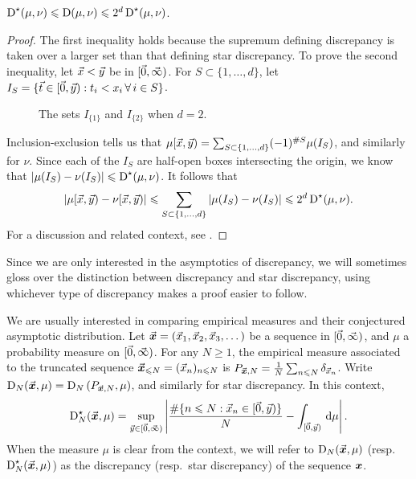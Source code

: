 \begin{lemma}\label{lem:star-reg-disc}
$\operatorname{D}^\star(\mu,\nu) \leqslant \operatorname{D}(\mu,\nu) \leqslant 2^d \operatorname{D}^\star(\mu,\nu)$. 
\end{lemma}
\begin{proof}
The first inequality holds because the supremum defining discrepancy is 
taken over a larger set than that defining star discrepancy. To prove the 
second inequality, let $\vec{x}<\vec{y}$ be in $[\vec{0},\vec{\infty})$. For 
$S\subset \{1,\dots,d\}$, let 
$I_S = \{ \vec{t} \in [\vec{0},\vec{y}) : t_i < x_i \,\forall\,i\in S\}$.
\begin{figure}[h]
\caption{The sets $I_{\{1\}}$ and $I_{\{2\}}$ when $d = 2$.}
\centering
{}
\end{figure}
Inclusion-exclusion tells us that 
$\mu[\vec{x},\vec{y}) = \sum_{S\subset \{1,\dots,d\}} (-1)^{\# S} \mu(I_S)$, 
and similarly for $\nu$. Since each of the $I_S$ are half-open boxes 
intersecting the origin, we know that 
$|\mu(I_S) - \nu(I_S)| \leqslant \operatorname{D}^\star(\mu,\nu)$. It follows that 
\[
	|\mu[\vec{x},\vec{y}) - \nu[\vec{x},\vec{y})| \leqslant \sum_{S\subset \{1,\dots,d\}} |\mu(I_S) - \nu(I_S)| \leqslant 2^d \operatorname{D}^\star(\mu,\nu) .
\]
For a discussion and related context, see 
\cite[Ch.~2 Ex.~1.2]{kuipers-niederreiter-1974}. 
\end{proof}

Since we are only interested in the asymptotics of discrepancy, we will 
sometimes gloss over the distinction between discrepancy and star discrepancy, 
using whichever type of discrepancy makes a proof easier to follow. 

We are usually interested in comparing empirical measures and their conjectured 
asymptotic distribution. 
Let $\vec{\boldsymbol x} = (\vec{x}_1,\vec{x}_2,\vec{x}_3,\dots)$ be a sequence in 
$[\vec{0},\vec{\infty})$, and $\mu$ a probability measure on $[\vec{0},\vec{\infty})$. For any 
$N\geqslant 1$, the empirical measure associated to the truncated 
sequence $\vec{\boldsymbol x}_{\leqslant N} = (\vec{x}_n)_{n\leqslant N}$ is 
$P_{\vec{\boldsymbol x},N} = \frac{1}{N} \sum_{n\leqslant N} \delta_{\vec{x}_n}$. Write 
$\operatorname{D}_N(\vec{\boldsymbol x},\mu) = \operatorname{D}_N\left( P_{\vec{\boldsymbol x},N},\mu\right)$, and similarly for star 
discrepancy. In this context, 
\[
	\operatorname{D}^\star_N(\vec{\boldsymbol x},\mu) = \sup_{\vec{y}\in [\vec{0},\vec{\infty})} \left| \frac{\# \{n\leqslant N : \vec{x}_n \in [\vec{0},\vec{y})\}}{N} - \int_{[\vec{0},\vec{y})} \, \mathrm{d}\mu\right| .
\]
When the measure $\mu$ is clear from the context, we will refer to 
$\operatorname{D}_N(\vec{\boldsymbol x},\mu)$ (resp.~$\operatorname{D}_N^\star(\vec{\boldsymbol x},\mu)$) as the discrepancy (resp.~star 
discrepancy) of the sequence ${\boldsymbol x}$.

